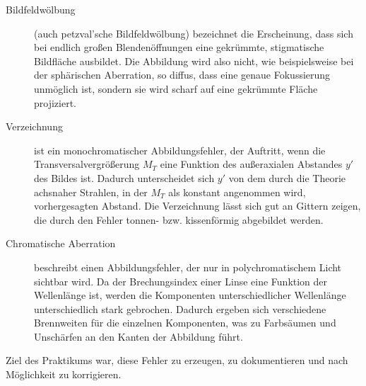 \begin{description}
	\item[Bildfeldwölbung] (auch petzval'sche Bildfeldwölbung) bezeichnet die Erscheinung, dass sich bei endlich großen Blendenöffnungen eine gekrümmte, stigmatische Bildfläche ausbildet. Die Abbildung wird also nicht, wie beispielsweise bei der sphärischen Aberration, so diffus, dass eine genaue Fokussierung unmöglich ist, sondern sie wird scharf auf eine gekrümmte Fläche projiziert. \cite[432ff.]{hecht2014optik}
	\item[Verzeichnung] ist ein monochromatischer Abbildungsfehler, der Auftritt, wenn die Transversalvergrößerung $M_T$ eine Funktion des außeraxialen Abstandes $y'$ des Bildes ist. Dadurch unterscheidet sich $y'$ von dem durch die Theorie achsnaher Strahlen, in der $M_T$ als konstant angenommen wird, vorhergesagten Abstand. Die Verzeichnung lässt sich gut an Gittern zeigen, die durch den Fehler tonnen- bzw. kissenförmig abgebildet werden. \cite[435ff.]{hecht2014optik}
	\item[Chromatische Aberration] beschreibt einen Abbildungsfehler, der nur in polychromatischem Licht sichtbar wird. Da der Brechungsindex einer Linse eine Funktion der Wellenlänge ist, werden die Komponenten unterschiedlicher Wellenlänge unterschiedlich stark gebrochen. Dadurch ergeben sich verschiedene Brennweiten für die einzelnen Komponenten, was zu Farbsäumen und Unschärfen an den Kanten der Abbildung führt. \cite[438ff.]{hecht2014optik}
\end{description}

Ziel des Praktikums war, diese Fehler zu erzeugen, zu dokumentieren und nach Möglichkeit zu korrigieren.
